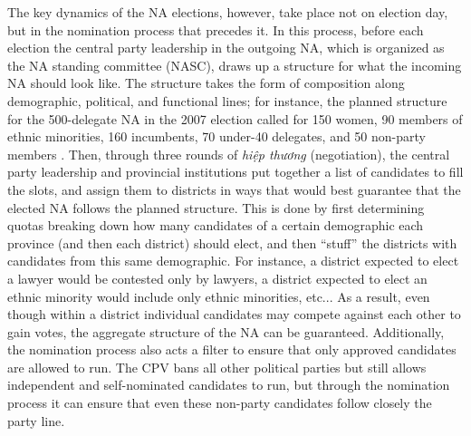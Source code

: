 \documentclass[12pt]{article}\usepackage[]{graphicx}\usepackage[]{color}
\newcommand{\1}{\mathbbm{1}}
\begin{document}
The key dynamics of the NA elections, however, take place not on election day, but in the nomination process that precedes it. In this process, before each election the central party leadership in the outgoing NA, which is organized as the NA standing committee (NASC), draws up a structure for what the incoming NA should look like. The structure takes the form of composition along demographic, political, and functional lines; for instance, the planned structure for the 500-delegate NA in the 2007 election called for 150 women, 90 members of ethnic minorities, 160 incumbents, 70 under-40 delegates, and 50 non-party members  \citep[506]{MaleskySchuler2011}. Then, through three rounds of \textit{hiệp thương} (negotiation), the central party leadership and provincial institutions put together a list of candidates to fill the slots, and assign them to districts in ways that would best guarantee that the elected NA follows the planned structure. This is done by first determining quotas breaking down how many candidates of a certain demographic each province (and then each district) should elect, and then ``stuff'' the districts with candidates from this same demographic. For instance, a district expected to elect a lawyer would be contested only by lawyers, a district expected to elect an ethnic minority would include only ethnic minorities, etc... As a result, even though within a district individual candidates may compete against each other to gain votes, the aggregate structure of the NA can be guaranteed. Additionally, the nomination process also acts a filter to ensure that only approved candidates are allowed to run. The CPV bans all other political parties but still allows independent and self-nominated candidates to run, but through the nomination process it can ensure that even these non-party candidates follow closely the party line.
\end{document}
